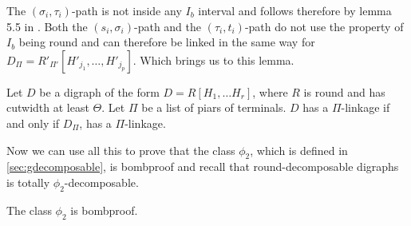 The $(\sigma_i,\tau_i)$-path is not inside any $I_b$ interval and follows therefore by lemma 5.5 in \cite{bangJGT77}. 
Both the $(s_i, \sigma_i)$-path and the $(\tau_i,t_i)$-path do not use the property of $I_b$ being round and can therefore be linked in the same way for $D_\Pi=R'_{\Pi'}[H'_{j_1},\dots ,H'_{j_p}]$. 
Which brings us to this lemma.
\begin{lemma}
    Let $D$ be a digraph of the form $D=R[H_1,\dots H_r]$, where $R$ is round and has cutwidth at least $\Theta$. Let $\Pi$ be a list of piars of terminals. $D$ has a $\Pi$-linkage if and only if $D_\Pi$, has a $\Pi$-linkage.
    \label{lemma:compressiondecom}
\end{lemma}
Now we can use all this to prove that the class $\phi_2$, which is defined in \autoref{sec:gdecomposable}, is bombproof and recall that round-decomposable digraphs is totally $\phi_2$-decomposable.
\begin{lemma}
    The class $\phi_2$ is bombproof.
\end{lemma}
